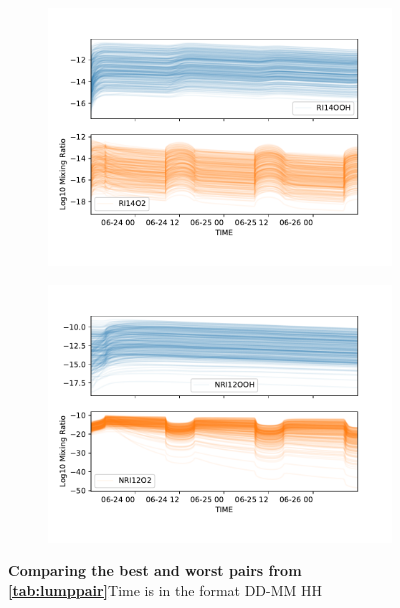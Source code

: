 \begin{figure}[H]
\begin{subfigure}[t]{.5\textwidth}
  \centering
  \includegraphics[width=\textwidth]{ensemble/RI14OOH-RI14O2.pdf}
  \caption{}
\end{subfigure}%
\begin{subfigure}[t]{.5\textwidth}
  \centering
  \includegraphics[width=\textwidth]{ensemble/NRI12OOH-NRI12O2.pdf}
  \caption{}
\end{subfigure}%
\caption{\textbf{Comparing the best and worst pairs from \autoref{tab:lumppair}}Time is in the format DD-MM HH}
\label{fig:lumppair}
\end{figure}





